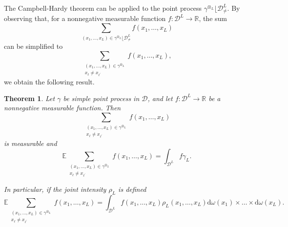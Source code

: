 \documentclass[twoside,11pt]{book}
\newtheorem{theorem}{Theorem}
\numberwithin{theorem}{chapter}
\numberwithin{definition}{chapter}
\numberwithin{proposition}{chapter}
\numberwithin{corollary}{chapter}
\numberwithin{example}{chapter}
\numberwithin{lemma}{chapter}
\numberwithin{assumption}{chapter}
\numberwithin{equation}{chapter}
\numberwithin{figure}{chapter}
\begin{document}
The Campbell-Hardy theorem can be applied to the point process $\gamma^{\otimes_{L}} \lfloor \mathcal{D}_{\neq}^{L}$. By observing that, for a nonnegative measurable function $f: \mathcal{D}^{L} \rightarrow \mathbb{R}$, the sum
\begin{equation}\label{eq:sum_over_configurations_campbell}
\sum\limits_{(x_{1}, \dots, x_{L}) \in \gamma^{\otimes_{L}} \lfloor \mathcal{D}_{\neq}^{L}} f(x_{1}, \dots, x_{L})
\end{equation}
can be simplified to 
\begin{equation}
\sum\limits_{\substack{(x_{1}, \dots, x_{L}) \in \gamma^{\otimes_{L}} \\ x_{\ell} \neq x_{\ell^{'}}}} f(x_{1}, \dots, x_{L}),
\end{equation}
we obtain the following result.
\begin{theorem}
Let $\gamma$ be simple point process in $\mathcal{D}$, and let $f: \mathcal{D}^{L} \rightarrow \mathbb{R}$ be a nonnegative measurable function. Then  
\begin{equation}
\sum\limits_{\substack{(x_{1}, \dots, x_{L}) \in \gamma^{\otimes_{L}} \\ x_{\ell} \neq x_{\ell^{'}}}} f(x_{1}, \dots, x_{L})
\end{equation}
is measurable and
\begin{equation}
\mathbb{E} \sum\limits_{\substack{(x_{1}, \dots, x_{L}) \in \gamma^{\otimes_{L}} \\ x_{\ell} \neq x_{\ell^{'}}}} f(x_{1}, \dots, x_{L}) = \int_{\mathcal{D}^{L}} f \gamma_{L}.
\end{equation}


In particular, if the joint intensity $\rho_L$ is defined
\begin{equation}
\mathbb{E}\sum\limits_{\substack{(x_{1}, \dots, x_{L}) \in \gamma^{\otimes_{L}} \\ x_{\ell} \neq x_{\ell^{'}}}} f(x_{1}, \dots, x_{L}) = \int_{\mathcal{D}^{L}} f(x_{1}, \dots, x_{L}) \rho_{L}(x_{1}, \dots, x_{L}) \mathrm{d}\omega(x_{1}) \times \dots \times \mathrm{d}\omega(x_{L}).
\end{equation}

\end{theorem}


\end{document}
